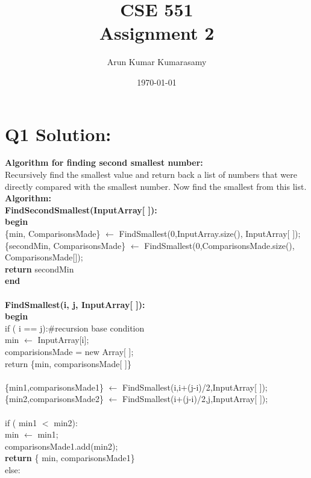 \documentclass[12pt, a4paper]{article}
\newcommand\tab[1][1cm]{\hspace*{#1}}
\begin{document}
\title {\textbf {CSE 551
\\Assignment 2}}
\author {Arun Kumar Kumarasamy}
\date{\today}
\maketitle

\section*{Q1 Solution:}
\textbf{Algorithm for finding second smallest number:}
\\Recursively find the smallest value and return back a list of numbers that were directly compared with the smallest number. Now find the smallest from this list. \\
\textbf{Algorithm:}
\\\textbf{FindSecondSmallest(InputArray[ ]):}
\\\textbf{begin}
\\\tab \{min, ComparisonsMade\} $\gets$ FindSmallest(0,InputArray.size(), InputArray[ ]);
\\\tab \{secondMin, ComparisonsMade\} $\gets$ FindSmallest(0,ComparisonsMade.size(), ComparisonsMade[]);
\\\tab \textbf{return} secondMin
\\\textbf{end}
\\
\\\textbf{FindSmallest(i, j, InputArray[ ]):}
\\\textbf{begin}
\\\tab if ( i == j):\tab \tab \tab \#recursion base condition
\\\tab\tab min $\gets$ InputArray[i];
\\\tab\tab comparisionsMade = new Array[ ];
\\\tab\tab return \{min, comparisonsMade[ ]\}
\\
\\\tab \{min1,comparisonsMade1\} $\gets$ FindSmallest(i,i+(j-i)/2,InputArray[ ]);
\\\tab \{min2,comparisonsMade2\} $\gets$ FindSmallest(i+(j-i)/2,j,InputArray[ ]);
\\
\\\tab if ( min1 $<$ min2):
\\\tab \tab min $\gets$ min1;
\\\tab \tab comparisonsMade1.add(min2);
\\\tab \tab \textbf{return} \{ min, comparisonsMade1\}
\\\tab else:
\end{document}
